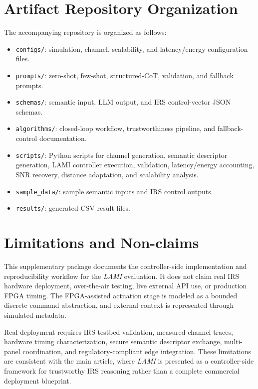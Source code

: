\documentclass[11pt]{article}
\begin{document}
\section{Artifact Repository Organization}

The accompanying repository is organized as follows:

\begin{itemize}[leftmargin=*]
    \item \texttt{configs/}: simulation, channel, scalability, and latency/energy configuration files.
    \item \texttt{prompts/}: zero-shot, few-shot, structured-CoT, validation, and fallback prompts.
    \item \texttt{schemas/}: semantic input, LLM output, and IRS control-vector JSON schemas.
    \item \texttt{algorithms/}: closed-loop workflow, trustworthiness pipeline, and fallback-control documentation.
    \item \texttt{scripts/}: Python scripts for channel generation, semantic descriptor generation, LAMI controller execution, validation, latency/energy accounting, SNR recovery, distance adaptation, and scalability analysis.
    \item \texttt{sample\_data/}: sample semantic inputs and IRS control outputs.
    \item \texttt{results/}: generated CSV result files.
\end{itemize}

\section{Limitations and Non-claims}

This supplementary package documents the controller-side implementation and reproducibility workflow for the \textit{LAMI} evaluation. It does not claim real IRS hardware deployment, over-the-air testing, live external API use, or production FPGA timing. The FPGA-assisted actuation stage is modeled as a bounded discrete command abstraction, and external context is represented through simulated metadata.

Real deployment requires IRS testbed validation, measured channel traces, hardware timing characterization, secure semantic descriptor exchange, multi-panel coordination, and regulatory-compliant edge integration. These limitations are consistent with the main article, where \textit{LAMI} is presented as a controller-side framework for trustworthy IRS reasoning rather than a complete commercial deployment blueprint.
\end{document}
